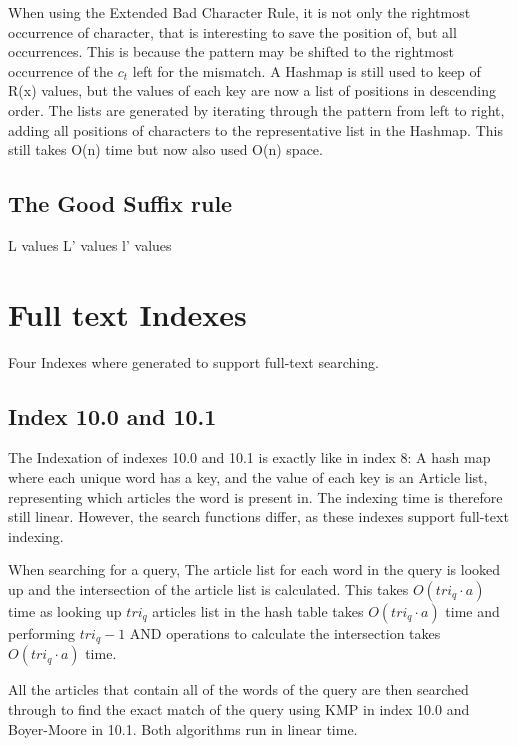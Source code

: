 
When using the Extended Bad Character Rule, it is not only the rightmost occurrence of character, that is interesting to save the position of,  but all occurrences. This is because the pattern may be shifted to the rightmost occurrence of the $c_t$ left for the mismatch. A Hashmap is still used to keep of R(x) values, but the values of each key are now a list of positions in descending order. The lists are generated by iterating through the pattern from left to right, adding all positions of characters to the representative list in the Hashmap. This still takes O(n) time but now also used O(n) space.


\subsection{The Good Suffix rule}

L values
L' values
l' values


\section{Full text Indexes}\label{sec:index10}
Four Indexes where generated to support full-text searching.

\subsection{Index 10.0 and 10.1}
The Indexation of indexes 10.0 and 10.1 is exactly like in index 8: A hash map where each unique word has a key, and the value of each key is an Article list, representing which articles the word is present in. The indexing time is therefore still linear. However, the search functions differ, as these indexes support full-text indexing.

When searching for a query, The article list for each word in the query is looked up and the intersection of the article list is calculated. This takes $O(tri_q\cdot a)$ time as looking up $tri_q$ articles list in the hash table takes $O(tri_q\cdot a)$ time and performing $tri_q - 1 $ AND operations to calculate the intersection takes $O(tri_q\cdot a)$ time.

All the articles that contain all of the words of the query are then searched through to find the exact match of the query using KMP in index 10.0 and Boyer-Moore in 10.1. Both algorithms run in linear time. 

